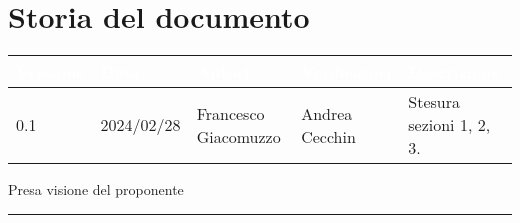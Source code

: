 \section{Storia del documento} \label{sec:storia}
\begingroup
\setlength{\tabcolsep}{10pt}
\renewcommand{\arraystretch}{1.5}
\begin{tabularx}{\textwidth}{| l | l | X | X | X |}
    \hline
    \rowcolor{headerrow} \textbf{\textcolor{white}{Versione}} & \textbf{\textcolor{white}{Data}} & \textbf{\textcolor{white}{Autori}} & \textbf{\textcolor{white}{Verificatori}} & \textbf{\textcolor{white}{Descrizione}} \\
    \hline
    0.1 & 2024/02/28 & Francesco Giacomuzzo & Andrea Cecchin & Stesura sezioni 1, 2, 3.\\
    \hline
\end{tabularx}
\endgroup
\begin{flushright}
\vspace{15pt}
Presa visione del proponente\\
\vspace{38pt}
\rule[10pt]{148pt}{0.4pt}
\end{flushright}